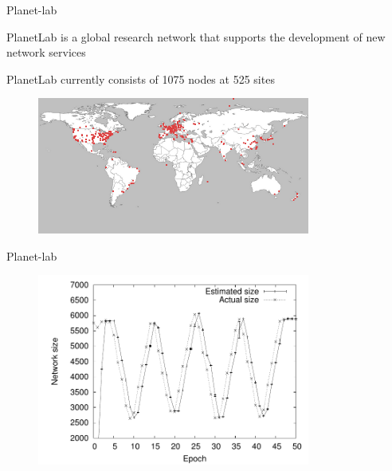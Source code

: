 \begin{frame}{Planet-lab}

\BI
\item PlanetLab is a global research network that supports the development of new network services
\item PlanetLab currently consists of 1075 nodes at 525 sites
\EI

\begin{figure}
\includegraphics[width=0.80\textwidth]{figs/11/planetlab}
\end{figure}

\end{frame}


\begin{frame}{Planet-lab}
\begin{figure}
\includegraphics[width=0.80\textwidth]{figs/11/planet}
\end{figure}


\end{frame}

